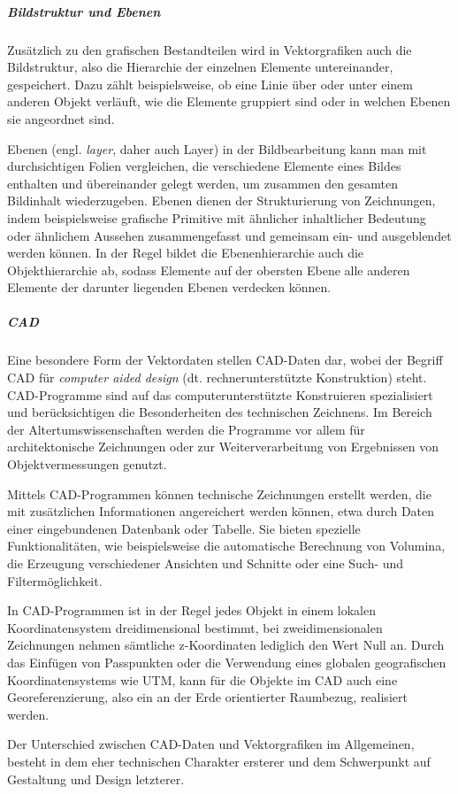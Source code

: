 \subparagraph{Bildstruktur und Ebenen}
Zusätzlich zu den grafischen Bestandteilen wird in Vektorgrafiken auch die Bildstruktur, also die Hierarchie der einzelnen Elemente untereinander, gespeichert. Dazu zählt beispielsweise, ob eine Linie über oder unter einem anderen Objekt verläuft, wie die Elemente gruppiert sind oder in welchen Ebenen sie angeordnet sind.

Ebenen (engl. \emph{layer}, daher auch Layer) in der Bildbearbeitung kann man mit durchsichtigen Folien vergleichen, die verschiedene Elemente eines Bildes enthalten und übereinander gelegt werden, um zusammen den gesamten Bildinhalt wiederzugeben. Ebenen dienen der Strukturierung von Zeichnungen, indem beispielsweise grafische Primitive mit ähnlicher inhaltlicher Bedeutung oder ähnlichem Aussehen zusammengefasst und gemeinsam ein- und ausgeblendet werden können. In der Regel bildet die Ebenenhierarchie auch die Objekthierarchie ab, sodass Elemente auf der obersten Ebene alle anderen Elemente der darunter liegenden Ebenen verdecken können.

\subparagraph{CAD} 
Eine besondere Form der Vektordaten stellen CAD-Daten dar, wobei der Begriff CAD für \emph{computer aided design} (dt. rechnerunterstützte Konstruktion) steht. CAD-Programme sind auf das computerunterstützte Konstruieren spezialisiert und berücksichtigen die Besonderheiten des technischen Zeichnens. Im Bereich der Altertumswissenschaften werden die Programme vor allem für architektonische Zeichnungen oder zur Weiterverarbeitung von Ergebnissen von Objektvermessungen genutzt.

Mittels CAD-Programmen können technische Zeichnungen erstellt werden, die mit zusätzlichen Informationen angereichert werden können, etwa durch Daten einer eingebundenen Datenbank oder Tabelle. Sie bieten spezielle Funktionalitäten, wie beispielsweise die automatische Berechnung von Volumina, die Erzeugung verschiedener Ansichten und Schnitte oder eine Such- und Filtermöglichkeit.

In CAD-Programmen ist in der Regel jedes Objekt in einem lokalen Koordinatensystem dreidimensional bestimmt, bei zweidimensionalen Zeichnungen nehmen sämtliche z-Koordinaten lediglich den Wert Null an. Durch das Einfügen von Passpunkten oder die Verwendung eines globalen geografischen Koordinatensystems wie UTM, kann für die Objekte im CAD auch eine Georeferenzierung, also ein an der Erde orientierter Raumbezug, realisiert werden. 

Der Unterschied zwischen CAD-Daten und Vektorgrafiken im Allgemeinen, besteht in dem eher technischen Charakter ersterer und dem Schwerpunkt auf Gestaltung und Design letzterer.


